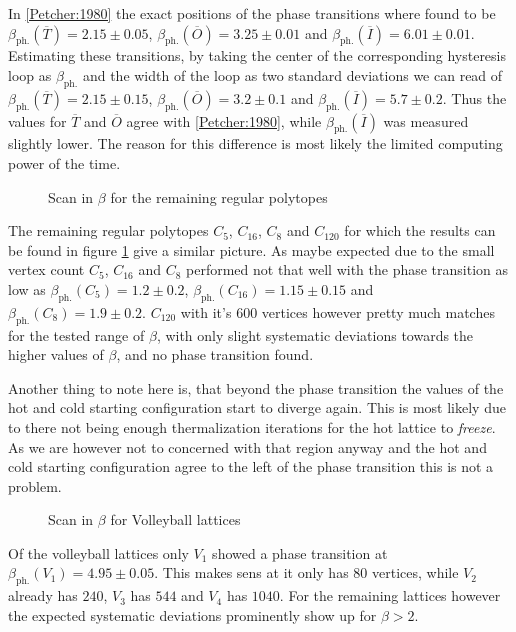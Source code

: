 In \ref{Petcher:1980} the exact positions of the phase transitions where found to be $\beta_{\textrm{ph.}}(\overline{T}) = 2.15 \pm 0.05$, $\beta_{\textrm{ph.}}(\overline{O}) = 3.25 \pm 0.01$ and $\beta_{\textrm{ph.}}(\overline{I}) = 6.01 \pm 0.01$.
Estimating these transitions, by taking the center of the corresponding hysteresis loop as $\beta_{\textrm{ph.}}$ and the width of the loop as two standard deviations we can read of $\beta_{\textrm{ph.}}(\overline{T}) = 2.15 \pm 0.15$, $\beta_{\textrm{ph.}}(\overline{O}) = 3.2 \pm 0.1$ and $\beta_{\textrm{ph.}}(\overline{I}) = 5.7 \pm 0.2$. Thus the values for $\overline{T}$ and $\overline{O}$ agree with \ref{Petcher:1980}, while $\beta_{\textrm{ph.}}(\overline{I})$ was measured slightly lower. The reason for this difference is most likely the limited computing power of the time.\\
\begin{figure}[!hbt]
 \centering
 
 \caption{Scan in $\beta$ for the remaining regular polytopes}
 \label{plot:regPolytopes}
\end{figure}

The remaining regular polytopes $C_5$, $C_{16}$, $C_8$ and $C_{120}$ for which the results can be found in figure \ref{plot:regPolytopes} give a similar picture. As maybe expected due to the small vertex count $C_{5}$, $C_{16}$ and $C_{8}$ performed not that well with the phase transition as low as $\beta_{\textrm{ph.}}(C_5) = 1.2 \pm 0.2$, $\beta_{\textrm{ph.}}(C_{16}) = 1.15 \pm 0.15$ and $\beta_{\textrm{ph.}}(C_{8}) = 1.9 \pm 0.2$.
$C_{120}$ with it's 600 vertices however pretty much matches \SUTwo for the tested range of $\beta$, with only slight systematic deviations towards the higher values of $\beta$, and no phase transition found.

Another thing to note here is, that beyond the phase transition the values of the hot and cold starting configuration start to diverge again. This is most likely due to there not being enough thermalization iterations for the hot lattice to \emph{freeze}. As we are however not to concerned with that region anyway and the hot and cold starting configuration agree to the left of the phase transition this is not a problem.\\

\begin{figure}[!hbt]
 \centering
 
 \caption{Scan in $\beta$ for Volleyball lattices}
\end{figure}
Of the volleyball lattices only $V_1$ showed a phase transition at $\beta_{\textrm{ph.}}(V_1) = 4.95 \pm 0.05 $. This makes sens at it only has $80$ vertices, while $V_2$ already has $240$, $ V_3 $ has $544$ and $ V_4 $ has $1040$. For the remaining lattices however the expected systematic deviations prominently show up for $\beta > 2$.

